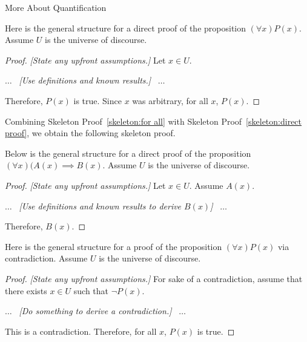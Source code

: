 \begin{section}{More About Quantification}
\begin{skeleton}\label{skeleton:for all}
Here is the general structure for a direct proof of the proposition $(\forall x)P(x)$. Assume $U$ is the universe of discourse.

\begin{mdframed}[style=skeleton]
\begin{proof}
\emph{[State any upfront assumptions.]} Let $x \in U$. 
\begin{center}
$\ldots$ \ \emph{[Use definitions and known results.]} \ $\ldots$\\
\end{center}
\noindent Therefore, $P(x)$ is true. Since $x$ was arbitrary, for all $x$, $P(x)$.
\end{proof}
\end{mdframed}
\end{skeleton}

Combining Skeleton Proof~\ref{skeleton:for all} with Skeleton Proof~\ref{skeleton:direct proof}, we obtain the following skeleton proof.

\begin{skeleton}\label{skeleton:for all direct proof}
Below is the general structure for a direct proof of the proposition $(\forall x)(A(x)\implies B(x)$. Assume $U$ is the universe of discourse.

\begin{mdframed}[style=skeleton]
\begin{proof}
\emph{[State any upfront assumptions.]} Let $x \in U$.  Assume $A(x)$.
\begin{center}
$\ldots$ \ \emph{[Use definitions and known results to derive $B(x)$]} \ $\ldots$\\
\end{center}
\noindent Therefore, $B(x)$.
\end{proof}
\end{mdframed}
\end{skeleton}

\begin{skeleton}
Here is the general structure for a proof of the proposition $(\forall x)P(x)$ via contradiction. Assume $U$ is the universe of discourse.

\begin{mdframed}[style=skeleton]
\begin{proof}
\emph{[State any upfront assumptions.]} For sake of a contradiction, assume that there exists $x\in U$ such that $\neg P(x)$. 
\begin{center}
$\ldots$ \ \emph{[Do something to derive a contradiction.]} \ $\ldots$\\
\end{center}
\noindent This is a contradiction. Therefore, for all $x$, $P(x)$ is true.
\end{proof}
\end{mdframed}
\end{skeleton}


\end{section}
